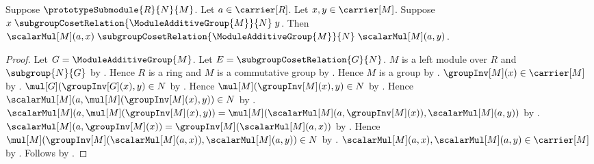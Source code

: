 \begin{proposition}\label{spike_quotient_scalar_respects_cosets}
    Suppose $\prototypeSubmodule{R}{N}{M}$.
    Let $a\in\carrier[R]$.
    Let $x,y\in\carrier[M]$.
    Suppose
        $x\mathrel{\subgroupCosetRelation{
            \ModuleAdditiveGroup{M}}{N}}y$.
    Then
        $\scalarMul[M](a,x)
            \mathrel{\subgroupCosetRelation{
                \ModuleAdditiveGroup{M}}{N}}
            \scalarMul[M](a,y)$.
\end{proposition}
\begin{proof}
    Let $G=\ModuleAdditiveGroup{M}$.
    Let $E=\subgroupCosetRelation{G}{N}$.
    $M$ is a left module over $R$ and $\subgroup{N}{G}$ by
        .
    Hence $R$ is a ring and $M$ is a commutative group by
        .
    Hence $M$ is a group by .
    $\groupInv[M](x)\in\carrier[M]$ by
        .
    $\mul[G](\groupInv[G](x),y)\in N$ by
        .
    Hence
        $\mul[M](\groupInv[M](x),y)\in N$ by
        .
    Hence
        $\scalarMul[M]
            (a,\mul[M](\groupInv[M](x),y))\in N$ by
        .
    $\scalarMul[M]
        (a,\mul[M](\groupInv[M](x),y))
        =\mul[M]
            (\scalarMul[M](a,\groupInv[M](x)),
             \scalarMul[M](a,y))$ by
        .
    $\scalarMul[M](a,\groupInv[M](x))
        =\groupInv[M](\scalarMul[M](a,x))$ by
        .
    Hence
        $\mul[M]
            (\groupInv[M](\scalarMul[M](a,x)),
             \scalarMul[M](a,y))\in N$ by \auto.
    $\scalarMul[M](a,x),\scalarMul[M](a,y)\in\carrier[M]$ by
        .
    Follows by
        .
\end{proof}

